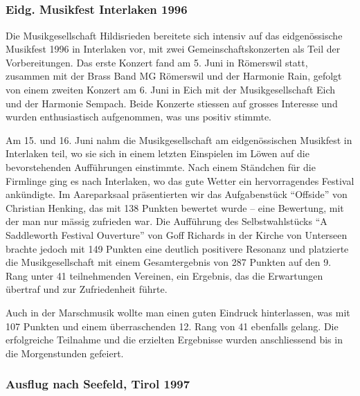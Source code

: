 \subsection*{}

\begin{history}

    \subsubsection*{Eidg. Musikfest Interlaken 1996}

    Die Musikgesellschaft Hildisrieden bereitete sich intensiv auf das
    eidgenössische Musikfest 1996 in Interlaken vor, mit zwei
    Gemeinschaftskonzerten als Teil der Vorbereitungen. Das erste Konzert fand
    am 5. Juni in Römerswil statt, zusammen mit der Brass Band MG Römerswil und
    der Harmonie Rain, gefolgt von einem zweiten Konzert am 6. Juni in Eich mit
    der Musikgesellschaft Eich und der Harmonie Sempach. Beide Konzerte stiessen
    auf grosses Interesse und wurden enthusiastisch aufgenommen, was uns positiv
    stimmte.

    Am 15. und 16. Juni nahm die Musikgesellschaft am eidgenössischen Musikfest
    in Interlaken teil, wo sie sich in einem letzten Einspielen im Löwen auf die
    bevorstehenden Aufführungen einstimmte. Nach einem Ständchen für die
    Firmlinge ging es nach Interlaken, wo das gute Wetter ein hervorragendes
    Festival ankündigte. Im Aareparksaal präsentierten wir das Aufgabenstück
    \enquote{Offside} von Christian Henking, das mit 138 Punkten bewertet wurde
    -- eine Bewertung, mit der man nur mässig zufrieden war. Die Aufführung des
    Selbstwahlstücks \enquote{A Saddleworth Festival Ouverture} von Goff
    Richards in der Kirche von Unterseen brachte jedoch mit 149 Punkten eine
    deutlich positivere Resonanz und platzierte die Musikgesellschaft mit einem
    Gesamtergebnis von 287 Punkten auf den 9. Rang unter 41 teilnehmenden
    Vereinen, ein Ergebnis, das die Erwartungen übertraf und zur Zufriedenheit
    führte.

    Auch in der Marschmusik wollte man einen guten Eindruck hinterlassen, was
    mit 107 Punkten und einem überraschenden 12. Rang von 41 ebenfalls gelang.
    Die erfolgreiche Teilnahme und die erzielten Ergebnisse wurden anschliessend
    bis in die Morgenstunden gefeiert.

    \subsubsection*{Ausflug nach Seefeld, Tirol 1997}


\end{history}
